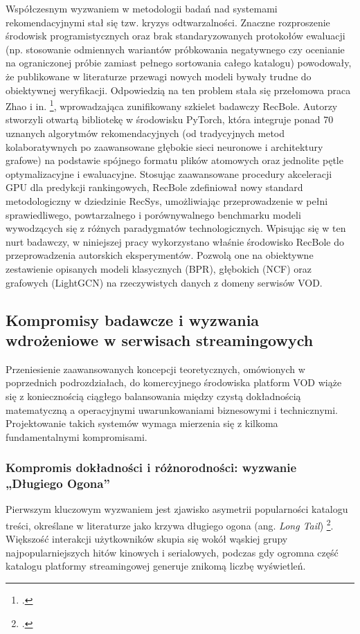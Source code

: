 Współczesnym wyzwaniem w metodologii badań nad systemami rekomendacyjnymi stał się tzw. kryzys odtwarzalności. Znaczne rozproszenie środowisk programistycznych oraz brak standaryzowanych protokołów ewaluacji (np. stosowanie odmiennych wariantów próbkowania negatywnego czy ocenianie na ograniczonej próbie zamiast pełnego sortowania całego katalogu) powodowały, że publikowane w literaturze przewagi nowych modeli bywały trudne do obiektywnej weryfikacji. Odpowiedzią na ten problem stała się przełomowa praca Zhao i in. \footcite{zhaoRecBoleUnifiedComprehensive2020}, wprowadzająca zunifikowany szkielet badawczy RecBole. Autorzy stworzyli otwartą bibliotekę w środowisku PyTorch, która integruje ponad 70 uznanych algorytmów rekomendacyjnych (od tradycyjnych metod kolaboratywnych po zaawansowane głębokie sieci neuronowe i architektury grafowe) na podstawie spójnego formatu plików atomowych oraz jednolite pętle optymalizacyjne i ewaluacyjne. Stosując zaawansowane procedury akceleracji GPU dla predykcji rankingowych, RecBole zdefiniował nowy standard metodologiczny w dziedzinie RecSys, umożliwiając przeprowadzenie w pełni sprawiedliwego, powtarzalnego i porównywalnego benchmarku modeli wywodzących się z różnych paradygmatów technologicznych. Wpisując się w ten nurt badawczy, w niniejszej pracy wykorzystano właśnie środowisko RecBole do przeprowadzenia autorskich eksperymentów. Pozwolą one na obiektywne zestawienie opisanych modeli klasycznych (BPR), głębokich (NCF) oraz grafowych (LightGCN) na rzeczywistych danych z domeny serwisów VOD.

\subsection{Kompromisy badawcze i wyzwania wdrożeniowe w serwisach streamingowych} %

Przeniesienie zaawansowanych koncepcji teoretycznych, omówionych w poprzednich podrozdziałach, do komercyjnego środowiska platform VOD wiąże się z koniecznością ciągłego balansowania między czystą dokładnością matematyczną a operacyjnymi uwarunkowaniami biznesowymi i technicznymi. Projektowanie takich systemów wymaga mierzenia się z kilkoma fundamentalnymi kompromisami.

\subsubsection{Kompromis dokładności i różnorodności: wyzwanie „Długiego Ogona”}

Pierwszym kluczowym wyzwaniem jest zjawisko asymetrii popularności katalogu treści, określane w literaturze jako krzywa długiego ogona (ang. \textit{Long Tail}) \footcite{celmaMusicRecommendationDiscovery2010}. Większość interakcji użytkowników skupia się wokół wąskiej grupy najpopularniejszych hitów kinowych i serialowych, podczas gdy ogromna część katalogu platformy streamingowej generuje znikomą liczbę wyświetleń.

